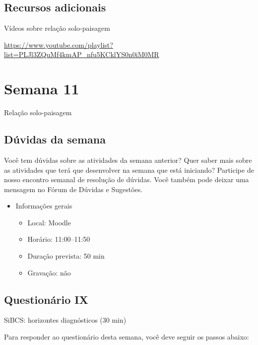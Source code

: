 \documentclass[
  11pt,
  a4paper,
  dvipsnames]{tufte-book}
\providecommand{\tightlist}{%
  \setlength{\itemsep}{0pt}\setlength{\parskip}{0pt}}
\begin{document}
\hypertarget{recursos-adicionais-6}{%
\section{Recursos adicionais}\label{recursos-adicionais-6}}

Vídeos sobre relação solo-paisagem

\url{https://www.youtube.com/playlist?list=PLJl3ZQuMf4kmAP_nfu5KCklYS0n0iM0MR}

\hypertarget{semana-11}{%
\chapter{Semana 11}\label{semana-11}}

Relação solo-paisagem

\hypertarget{duxfavidas-da-semana-9}{%
\section{Dúvidas da semana}\label{duxfavidas-da-semana-9}}

Você tem dúvidas sobre as atividades da semana anterior? Quer saber mais sobre as atividades que terá que desenvolver na semana que está iniciando? Participe de nosso encontro semanal de resolução de dúvidas. Você também pode deixar uma mensagem no Fórum de Dúvidas e Sugestões.

\begin{itemize}
\tightlist
\item
  Informações gerais

  \begin{itemize}
  \tightlist
  \item
    Local: Moodle
  \item
    Horário: 11:00--11:50
  \item
    Duração prevista: 50 min
  \item
    Gravação: não
  \end{itemize}
\end{itemize}

\hypertarget{questionuxe1rio-ix}{%
\section{Questionário IX}\label{questionuxe1rio-ix}}

SiBCS: horizontes diagnósticos (30 min)

Para responder ao questionário desta semana, você deve seguir os passos abaixo:
\end{document}
